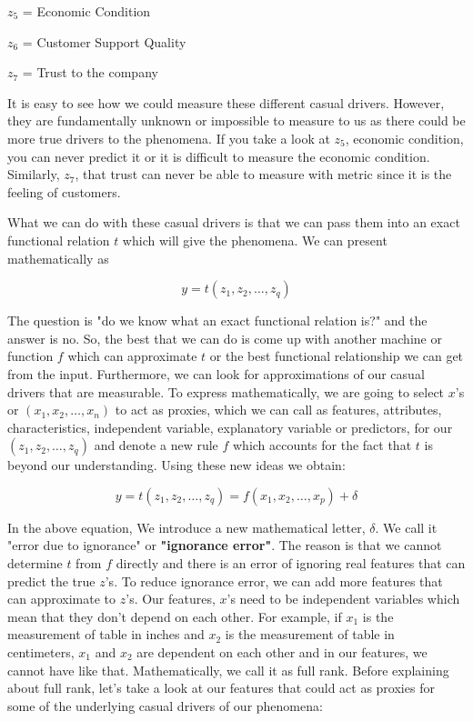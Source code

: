 \documentclass[12pt]{article}
\begin{document}
$z_5$ = Economic Condition

$z_6$ = Customer Support Quality

$z_7$ = Trust to the company

It is easy to see how we could measure these different casual drivers. However, they are fundamentally unknown or impossible to measure to us as there could be more true drivers to the phenomena. If you take a look at $z_5$, economic condition, you can never predict it or it is difficult to measure the economic condition. Similarly, $z_7$, that trust can never be able to measure with metric since it is the feeling of customers. 

What we can do with these casual drivers is that we can pass them into an exact functional relation $t$ which will give the phenomena. We can present mathematically as 

\[
y =t(z_1, z_2, \dots, z_q)
\]

The question is "do we know what an exact functional relation is?" and the answer is no. So, the best that we can do is come up with another machine or function $f$ which can approximate $t$ or the best functional relationship we can get from the input. Furthermore, we can look for approximations of our casual drivers that are measurable. To express mathematically, we are going to select $x$'s or $(x_1, x_2, \dots, x_n)$ to act as proxies, which we can call as features, attributes, characteristics, independent variable, explanatory variable or predictors, for our $(z_1, z_2, \dots, z_q)$ and denote a new rule $f$ which accounts for the fact that $t$ is beyond our understanding. Using these new ideas we obtain:

\[
y = t(z_1, z_2, \dots, z_q) = f(x_1, x_2, \dots, x_p) + \delta 
\]

In the above equation, We introduce a new mathematical letter, $\delta$. We call it "error due to ignorance" or \textbf{"ignorance error"}. The reason is that we cannot determine $t$ from $f$ directly and there is an error of ignoring real features that can predict the true $z$'s. To reduce ignorance error, we can add more features that can approximate to $z$'s. Our features, $x$'s need to be independent variables which mean that they don't depend on each other. For example, if $x_1$ is the measurement of table in inches and $x_2$ is the measurement of table in centimeters, $x_1$ and $x_2$ are dependent on each other and in our features, we cannot have like that. Mathematically, we call it as full rank. Before explaining about full rank, let's take a look at our features that could act as proxies for some of the underlying casual drivers of our phenomena:
\end{document}
